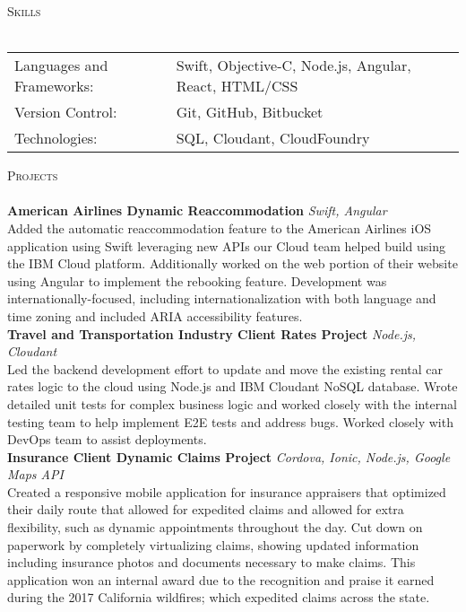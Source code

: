 \documentclass[a4paper]{article}
\newcommand{\lineunder} {
    \vspace*{-8pt} \\
    \hspace*{-18pt} \hrulefill \\
}
\newcommand{\header} [1] {
    {\hspace*{-18pt}\vspace*{6pt} \textsc{#1}}
    \vspace*{-6pt} \lineunder
}
\begin{document}
\header{Skills}
\begin{tabular}{ l l }
	Languages and Frameworks: & Swift, Objective-C, Node.js, Angular, React, HTML/CSS \\
	Version Control:          & Git, GitHub, Bitbucket                                \\
	Technologies:             & SQL, Cloudant, CloudFoundry                           \\
\end{tabular}
\vspace{2mm}

\header{Projects}
{\textbf{American Airlines Dynamic Reaccommodation}} {\sl Swift, Angular} \\
Added the automatic reaccommodation feature to the American Airlines iOS application using Swift leveraging new APIs our Cloud team helped build using the IBM Cloud platform. Additionally worked on the web portion of their website using Angular to implement the rebooking feature. Development was internationally-focused, including internationalization with both language and time zoning and included ARIA accessibility features.\\
\vspace*{2mm}
{\textbf{Travel and Transportation Industry Client Rates Project}} {\sl Node.js, Cloudant} \\
Led the backend development effort to update and move the existing rental car rates logic to the cloud using Node.js and IBM Cloudant NoSQL database. Wrote detailed unit tests for complex business logic and worked closely with the internal testing team to help implement E2E tests and address bugs. Worked closely with DevOps team to assist deployments.\\
\vspace*{2mm}
\pagebreak
{\textbf{Insurance Client Dynamic Claims Project}} {\sl Cordova, Ionic, Node.js, Google Maps API} \\
Created a responsive mobile application for insurance appraisers that optimized their daily route that allowed for expedited claims and allowed for extra flexibility, such as dynamic appointments throughout the day. Cut down on paperwork by completely virtualizing claims, showing updated information including insurance photos and documents necessary to make claims. This application won an internal award due to the recognition and praise it earned during the 2017 California wildfires; which expedited claims across the state.\\
\vspace*{2mm}
\end{document}
